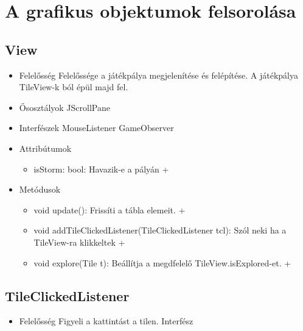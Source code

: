 \section{A grafikus objektumok felsorolása}

\subsection{View}
\begin{itemize}
\item Felelősség\newline
Felelőssége a játékpálya megjelenítése és felépítése. A játékpálya TileView-k ból épül majd fel.
\item Ősosztályok\newline
JScrollPane
\item Interfészek\newline
MouseListener GameObserver
\item Attribútumok\newline
	\begin{itemize}
		\item isStorm: bool: Havazik-e a pályán +
	\end{itemize}
\item Metódusok\newline
	\begin{itemize}
		\item void update(): Frissíti a tábla elemeit. +
		\item void addTileClickedListener(TileClickedListener tcl): Szól neki ha a TileView-ra klikkeltek +
		\item void explore(Tile t): Beállítja a megdfelelő TileView.isExplored-et. +
	\end{itemize}
\end{itemize}

\subsection{TileClickedListener}
\begin{itemize}
	\item Felelősség\newline
	Figyeli a kattintást a tilen. Interfész
\end{itemize}

